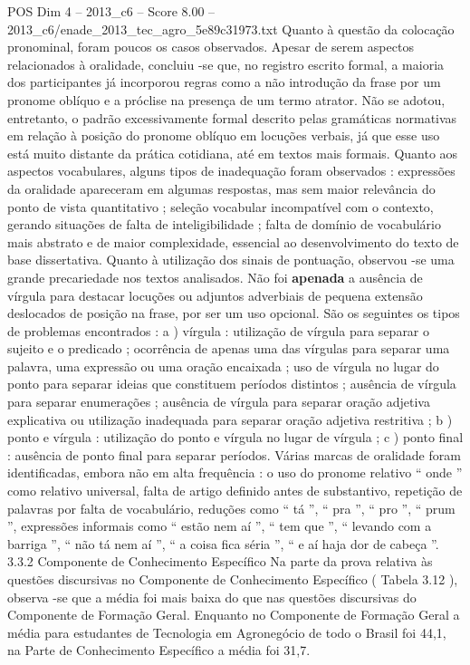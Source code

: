 \begin{textsample}{POS Dim 4 – 2013\_c6 – Score 8.00 – 2013\_c6/enade\_2013\_tec\_agro\_5e89c31973.txt}
Quanto à questão da colocação pronominal, foram poucos os casos observados.
Apesar de serem aspectos relacionados à oralidade, concluiu -se que, no registro escrito formal, a maioria dos participantes já incorporou regras como a não introdução da frase por um pronome oblíquo e a próclise na presença de um termo atrator.
Não se adotou, entretanto, o padrão excessivamente formal descrito pelas gramáticas normativas em relação à posição do pronome oblíquo em locuções verbais, já que esse uso está muito distante da prática cotidiana, até em textos mais formais.
Quanto aos aspectos vocabulares, alguns tipos de inadequação foram observados : expressões da oralidade apareceram em algumas respostas, mas sem maior relevância do ponto de vista quantitativo ; seleção vocabular incompatível com o contexto, gerando situações de falta de inteligibilidade ; falta de domínio de vocabulário mais abstrato e de maior complexidade, essencial ao desenvolvimento do texto de base dissertativa.
Quanto à utilização dos sinais de pontuação, observou -se uma grande precariedade nos textos analisados.
Não foi \textbf{apenada} a ausência de vírgula para destacar locuções ou adjuntos adverbiais de pequena extensão deslocados de posição na frase, por ser um uso opcional.
São os seguintes os tipos de problemas encontrados : a ) vírgula : utilização de vírgula para separar o sujeito e o predicado ; ocorrência de apenas uma das vírgulas para separar uma palavra, uma expressão ou uma oração encaixada ; uso de vírgula no lugar do ponto para separar ideias que constituem períodos distintos ; ausência de vírgula para separar enumerações ; ausência de vírgula para separar oração adjetiva explicativa ou utilização inadequada para separar oração adjetiva restritiva ; b ) ponto e vírgula : utilização do ponto e vírgula no lugar de vírgula ; c ) ponto final : ausência de ponto final para separar períodos.
Várias marcas de oralidade foram identificadas, embora não em alta frequência : o uso do pronome relativo “ onde ” como relativo universal, falta de artigo definido antes de substantivo, repetição de palavras por falta de vocabulário, reduções como “ tá ”, “ pra ”, “ pro ”, “ prum ”, expressões informais como “ estão nem aí ”, “ tem que ”, “ levando com a barriga ”, “ não tá nem aí ”, “ a coisa fica séria ”, “ e aí haja dor de cabeça ”. 3.3.2 Componente de Conhecimento Específico Na parte da prova relativa às questões discursivas no Componente de Conhecimento Específico ( Tabela 3.12 ), observa -se que a média foi mais baixa do que nas questões discursivas do Componente de Formação Geral.
Enquanto no Componente de Formação Geral a média para estudantes de Tecnologia em Agronegócio de todo o Brasil foi 44,1, na Parte de Conhecimento Específico a média foi 31,7.

\end{textsample}
